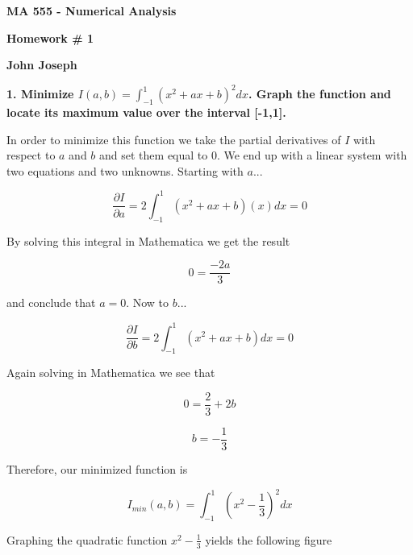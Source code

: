 \documentclass[a4paper,12pt]{article}
\begin{document}
\begin{center}

{\Large\bf MA 555 - Numerical Analysis}
\bigskip

{\large\bf Homework \# 1}
\smallskip

{\large\bf John Joseph}
\end{center}

\bigskip
{\bf 1. Minimize $I(a,b)=\int_{-1}^1(x^2+ax+b)^2 dx $. Graph the function and locate its maximum value over the interval [-1,1].  }

In order to minimize this function we take the partial derivatives of $I$ with respect to $a$ and $b$ and set them equal to 0. We end up with a linear system with two equations and two unknowns. Starting with $a$...

\begin{equation}
\frac{\partial I}{\partial a} = 2 \int_{-1}^1(x^2+ax+b)(x) dx = 0
\end{equation}

By solving this integral in Mathematica we get the result 

\begin{equation}
0 = \frac{-2a}{3}
\end{equation}

and conclude that $a=0$. Now to $b$...

\begin{equation}
\frac{\partial I}{\partial b} = 2 \int_{-1}^1(x^2+ax+b) dx = 0
\end{equation}

Again solving in Mathematica we see that

\begin{equation}
0 = \frac{2}{3} + 2b
\end{equation}

\begin{equation}
b = -\frac{1}{3}
\end{equation}

Therefore, our minimized function is 

\begin{equation}
I_{min}(a,b) = \int_{-1}^1(x^2-\frac{1}{3})^2 dx
\end{equation}

\vfil\eject

Graphing the quadratic function $x^2-\frac{1}{3}$ yields the following figure

\begin{center}
  \begin{figure}[h!]
  \end{figure}
\end{center}
\end{document}
